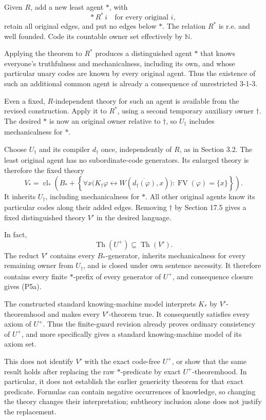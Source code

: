 \documentclass[
  11pt,
  letterpaper,
]{article}
\begin{document}
Given \(R\), add a new least agent \(*\), with \[
*\,R^*\,i\quad\text{for every original }i,
\] retain all original edges, and put no edges below \(*\). The relation
\(R^*\) is r.e. and well founded. Code its countable owner set
effectively by \(\mathbb N\).

Applying the theorem to \(R^*\) produces a distinguished agent \(*\)
that knows everyone's truthfulness and mechanicalness, including its
own, and whose particular unary codes are known by every original agent.
Thus the existence of such an additional common agent is already a
consequence of unrestricted 3-1-3.

Even a fixed, \(R\)-independent theory for such an agent is available
from the revised construction. Apply it to \(R^*\), using a second
temporary auxiliary owner \(\dagger\). The desired \(*\) is now an
original owner relative to \(\dagger\), so \(U_\dagger\) includes
mechanicalness for \(*\).

Choose \(U_\dagger\) and its compiler \(d_\dagger\) once, independently
of \(R\), as in Section 3.2. The least original agent has no
subordinate-code generators. Its enlarged theory is therefore the fixed
theory \[
V_*=
\operatorname{cl}_*\left(
 B_*+
 \left\{\forall x\bigl(
 K_\dagger\varphi\leftrightarrow
 W(\overline{d_\dagger(\varphi)},x)\bigr):
                       \operatorname{FV}(\varphi)=\{x\}\right\}
\right).
\tag{P5}
\] It inherits \(U_\dagger\), including mechanicalness for \(*\). All
other original agents know its particular codes along their added edges.
Removing \(\dagger\) by Section 17.5 gives a fixed distinguished theory
\(V'\) in the desired language.

In fact, \[
\operatorname{Th}(U^+)\subseteq\operatorname{Th}(V').
\tag{P5a}
\] The reduct \(V'\) contains every \(B_*\)-generator, inherits
mechanicalness for every remaining owner from \(U_\dagger\), and is
closed under own sentence necessity. It therefore contains every finite
\(*\)-prefix of every generator of \(U^+\), and consequence closure
gives (P5a).

The constructed standard knowing-machine model interprets \(K_*\) by
\(V'\)-theoremhood and makes every \(V'\)-theorem true. It consequently
satisfies every axiom of \(U^+\). Thus the finite-guard revision already
proves ordinary consistency of \(U^+\), and more specifically gives a
standard knowing-machine model of its axiom set.

This does not identify \(V'\) with the exact code-free \(U^+\), or show
that the same result holds after replacing the raw \(*\)-predicate by
exact \(U^+\)-theoremhood. In particular, it does not establish the
earlier genericity theorem for that exact predicate. Formulas can
contain negative occurrences of knowledge, so changing the theory
changes their interpretation; subtheory inclusion alone does not justify
the replacement.
\end{document}
